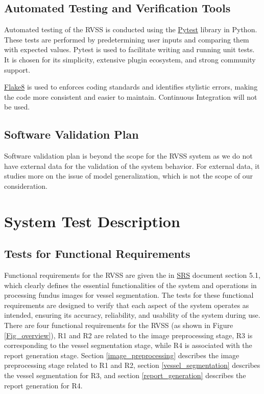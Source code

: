 \documentclass[12pt, titlepage]{article}
\begin{document}
\subsection{Automated Testing and Verification Tools}
\label{automated_testing_verification_tools}

Automated testing of the RVSS is conducted using the \href{https://docs.pytest.org/en/7.2.x/}{Pytest} library in Python. These tests are performed by predetermining user inputs and comparing them with expected values. Pytest is used to facilitate writing and running unit tests. It is chosen for its simplicity, extensive plugin ecosystem, and strong community support. 

\href{https://pypi.python.org/pypi/flake8/}{Flake8} is used to enforces coding standards and identifies stylistic errors, making the code more consistent and easier to maintain. Continuous Integration will not be used.  

\subsection{Software Validation Plan}
\label{software_validation_plan}

Software validation plan is beyond the scope for the RVSS system as we do not have external data for the validation of the system behavior. For external data, it studies more on the issue of model generalization, which is not the scope of our consideration.

\section{System Test Description}
\label{systemtests}
	
\subsection{Tests for Functional Requirements}

Functional requirements for the RVSS are given the in \href{https://github.com/lele0007/Blood-vessel-segmentation/blob/main/docs/SRS/SRS.pdf}{SRS} document section 5.1, which clearly defines  the essential functionalities of the system and operations in processing fundus images for vessel segmentation. The tests for these functional requirements are designed to verify that each aspect of the system operates as intended, ensuring its accuracy, reliability, and usability of the system during use. There are four functional requirements for the RVSS (as shown in Figure \ref{Fig_overview}), R1 and R2 are related to the image preprocessing stage, R3 is corresponding to the vessel segmentation stage, while R4 is associated with the report generation stage. Section \ref{image_preprocessing} describes the image preprocessing stage related to R1 and R2, section \ref{vessel_segmentation} describes the vessel segmentation for R3, and section \ref{report_generation} describes the report generation for R4.     
\end{document}
